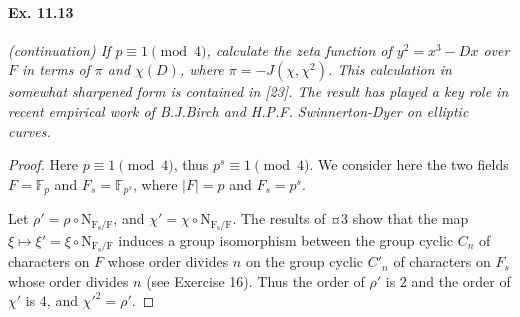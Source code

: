 \documentclass[11pt,a4paper]{article}
\newcommand{\F}{\mathbb{F}}
\begin{document}
\paragraph{Ex. 11.13}{\it (continuation) If $p\equiv 1 \pmod 4$, calculate the zeta function of $y^2 = x^3 - Dx$ over $F$ in terms of $\pi$ and $\chi(D)$, where $\pi = -J(\chi,\chi^2)$. This calculation in somewhat sharpened form is contained in [23]. The result has played a key role in recent empirical work of B.J.Birch and H.P.F. Swinnerton-Dyer on elliptic curves.
}

\begin{proof}
Here $p\equiv1 \pmod 4$, thus $p^s \equiv 1 \pmod 4$. We consider here the two fields $F = \F_p$ and $F_s = \F_{p^s}$, where $|F| = p$ and $F_s = p^s$.

Let $\rho' = \rho \circ \mathrm{N_{F_s/F}}$, and $\chi' = \chi \circ  \mathrm{N_{F_s/F}}$. The results of ¤3 show that the map $\xi \mapsto \xi' = \xi \circ\mathrm{N_{F_s/F}}$ induces a group isomorphism between the group cyclic $C_n$ of characters on $F$ whose order divides $n$ on the group cyclic $C'_n$ of characters  on $F_s$ whose order divides $n$ (see Exercise 16). Thus the order of $\rho'$ is $2$ and the order of $\chi'$ is $4$, and $\chi'^2 = \rho'$.


\end{proof}
\end{document}
